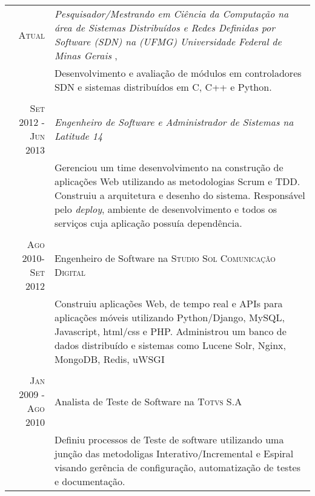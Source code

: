 \documentclass[a4paper,10pt]{article} %
\begin{document}
\begin{tabular}{r|p{11cm}}

\textsc{Atual} & \emph{ Pesquisador/Mestrando em Ciência da Computação na
área de Sistemas Distribuídos e Redes Definidas por Software (SDN) 
na (UFMG) Universidade Federal de Minas Gerais }, \\ 
& \footnotesize{Desenvolvimento e avaliação de módulos em controladores SDN
e sistemas distribuídos em C, C++ e Python.} \\
\multicolumn{2}{c}{} \\

\textsc{Set 2012 - Jun 2013} & \emph{Engenheiro de Software e Administrador 
de Sistemas na Latitude 14} \\ 
& \footnotesize{Gerenciou um time desenvolvimento na construção de 
aplicações Web utilizando as metodologias Scrum e TDD.
Construiu a arquitetura e desenho do sistema.
Responsável pelo \emph{deploy}, ambiente de desenvolvimento e todos 
os serviços cuja aplicação possuía dependência. } \\
\multicolumn{2}{c}{} \\


\textsc{Ago 2010-Set 2012} & Engenheiro de Software na \textsc{Studio Sol
Comunicação Digital}  \\
& \footnotesize{Construiu aplicações Web, de tempo real e 
APIs para aplicações móveis utilizando Python/Django, MySQL, 
Javascript, html/css e PHP.
Administrou um banco de dados distribuído e sistemas como 
Lucene Solr, Nginx, MongoDB, Redis, uWSGI}\\
\multicolumn{2}{c}{} \\


\textsc{Jan 2009 - Ago 2010} & Analista de Teste de Software
na \textsc{Totvs S.A} \\
& \footnotesize{Definiu processos de Teste de software utilizando uma
junção das metodoligas Interativo/Incremental e Espiral visando 
gerência de configuração, automatização de testes e documentação.}
\end{tabular}




\end{document}

